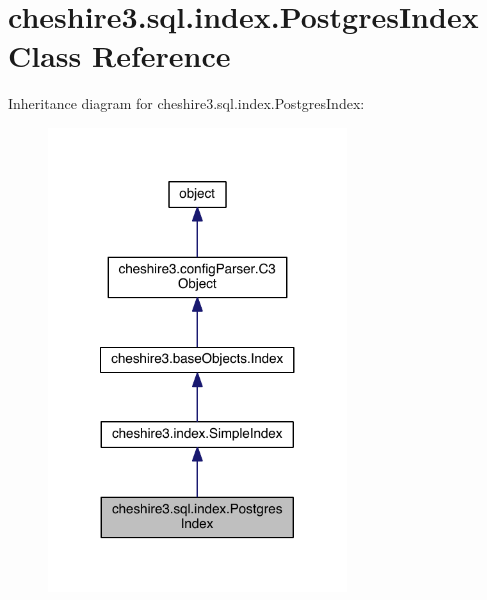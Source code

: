 \hypertarget{classcheshire3_1_1sql_1_1index_1_1_postgres_index}{\section{cheshire3.\-sql.\-index.\-Postgres\-Index Class Reference}
\label{classcheshire3_1_1sql_1_1index_1_1_postgres_index}
}


Inheritance diagram for cheshire3.\-sql.\-index.\-Postgres\-Index\-:
\nopagebreak
\begin{figure}[H]
\begin{center}
\leavevmode
\includegraphics[width=224pt]{classcheshire3_1_1sql_1_1index_1_1_postgres_index__inherit__graph}
\end{center}
\end{figure}


